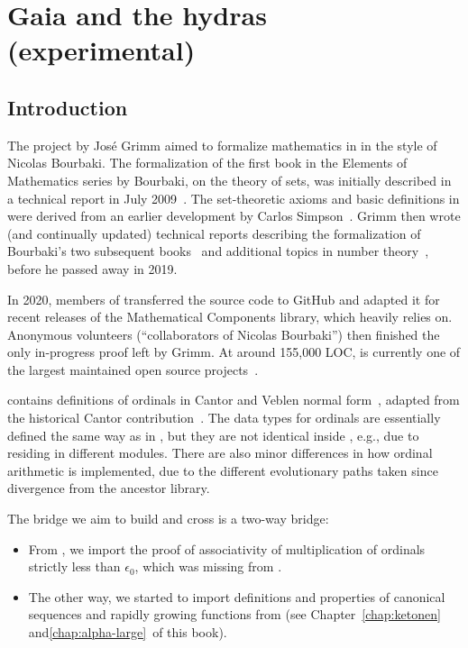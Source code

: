 \chapter{Gaia and the hydras (experimental)}

\section{Introduction}
The \gaia project by Jos\'e Grimm aimed to formalize mathematics in \coq in
the style of Nicolas Bourbaki. The formalization of the first book in the
Elements of Mathematics series by Bourbaki, on the theory of sets, was
initially described in a technical report in July 2009~\cite{Grimm2009a}.
The set-theoretic axioms and basic definitions in \gaia were derived
from an earlier development by Carlos Simpson~\cite{Simpson2004,CatsZFCContrib}.
Grimm then wrote (and continually updated) technical reports describing the
formalization of Bourbaki's two subsequent books~\cite{Grimm2009b,Grimm2016}
and additional topics in number theory~\cite{grimm:hal-00911710,Grimm2014},
before he passed away in 2019.

In 2020, members of \community transferred the \gaia source code to
GitHub and adapted it for recent releases of the Mathematical Components
library, which \gaia heavily relies on.
Anonymous volunteers (``collaborators of Nicolas Bourbaki'') then finished
the only in-progress proof left by Grimm. At around 155,000 LOC, \gaia is currently one of the largest maintained open source \coq projects~\cite{Gaia}.

\gaia contains definitions of ordinals in Cantor and Veblen normal form~\cite{grimm:hal-00911710}, adapted from the historical Cantor contribution~\cite{CantorContrib}. The data types for ordinals are essentially defined the same way as in \Hydras, but they are not identical inside \coq, e.g., due to residing in different modules. There are also minor differences in how ordinal arithmetic is implemented, due to the different evolutionary paths taken since divergence from the ancestor library.



The bridge we aim to build and cross is a two-way bridge:

\begin{itemize}
\item From \gaia, we import the proof of associativity of multiplication of ordinals strictly less than $\epsilon_0$, which was missing from \Hydras.
  \item The other way, we started to import definitions and properties of canonical sequences and rapidly growing functions from \Hydras (see Chapter~\ref{chap:ketonen} and\ref{chap:alpha-large}~of this book).
\end{itemize}

